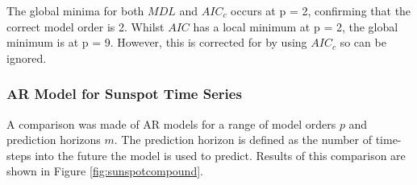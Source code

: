 \noindent
The global minima for both $MDL$ and $AIC_{c}$ occurs at p = 2, confirming that the correct model order is 2. Whilst $AIC$ has a local minimum at p = 2, the global minimum is at p = 9. However, this is corrected for by using $AIC_{c}$ so can be ignored. 

\subsubsection{AR Model for Sunspot Time Series}

A comparison was made of AR models for a range of model orders $p$ and prediction horizons $m$. The prediction horizon is defined as the number of time-steps into the future the model is used to predict. Results of this comparison are shown in Figure \ref{fig:sunspotcompound}.

